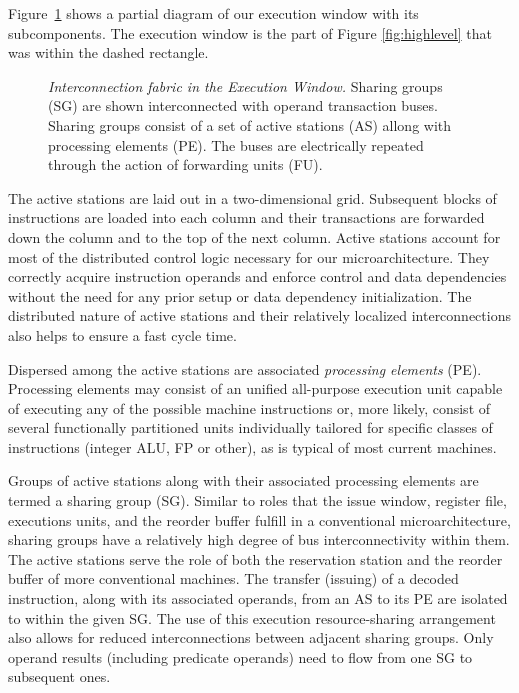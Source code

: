 \documentclass[10pt,twocolumn]{IEEEtran}
\begin{document}
Figure~\ref{fig:execwind} shows a partial diagram of our execution
window with its subcomponents.   The execution window is the part
of Figure \ref{fig:highlevel} that was within the dashed rectangle.
%
\begin{figure}
\caption{{\em Interconnection fabric in the Execution Window.}
Sharing groups (SG) are shown interconnected with operand
transaction buses.  Sharing groups consist of a set of active
stations (AS) allong with processing elements (PE).
The buses are electrically repeated through the action of
forwarding units (FU).}
\label{fig:execwind}
\end{figure}
%
The active stations are laid out in a
two-dimensional grid.  Subsequent blocks of instructions are loaded
into each column and their transactions are forwarded down the column
and to the top of the next column.  
Active stations account for
most of the distributed control logic necessary for our
microarchitecture.  They correctly acquire instruction operands and 
enforce control and data dependencies
without
the need for any prior setup or data dependency initialization.  
The distributed
nature of active stations and their relatively localized interconnections
also helps to ensure a fast cycle time.

Dispersed among the active stations are associated \emph{processing elements}
(PE).  Processing elements may consist of an unified all-purpose
execution unit capable of executing any of the possible machine
instructions or, more likely, consist of several functionally
partitioned units individually tailored for specific classes of
instructions (integer ALU, FP or other), as is typical of most current
machines.

Groups of active stations along with their associated
processing elements are termed a sharing group (SG).
Similar to roles that the issue window, register file, executions units,
and the reorder buffer fulfill in
a conventional microarchitecture, sharing groups
have a relatively high degree of bus interconnectivity
within them.  The active stations
serve the role of both the reservation station and the reorder buffer
of more conventional machines.  
The transfer (issuing) of a decoded instruction,
along with its associated operands, from an AS to its PE are isolated to
within the given SG.  The use of this execution resource-sharing
arrangement also allows for reduced interconnections between adjacent
sharing groups.  Only operand results (including predicate operands)
need to flow from one SG to subsequent ones.
%
%
\end{document}
